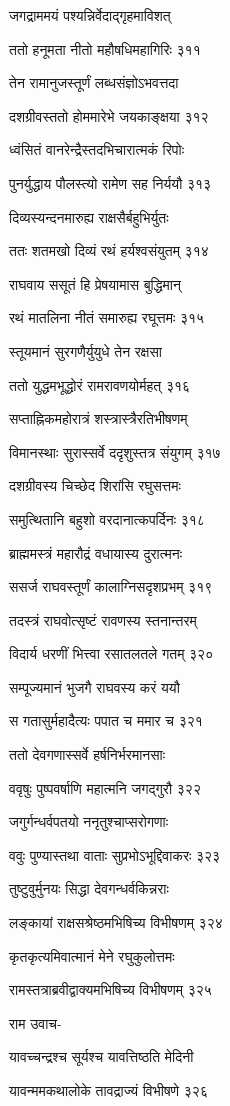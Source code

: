 जगद्राममयं पश्यन्निर्वेदाद्गृहमाविशत्

ततो हनूमता नीतो महौषधिमहागिरिः ३११

तेन रामानुजस्तूर्णं लब्धसंज्ञोऽभवत्तदा

दशग्रीवस्ततो होममारेभे जयकाङ्क्षया ३१२

ध्वंसितं वानरेन्द्रैस्तदभिचारात्मकं रिपोः

पुनर्युद्धाय पौलस्त्यो रामेण सह निर्ययौ ३१३

दिव्यस्यन्दनमारुह्य राक्षसैर्बहुभिर्युतः

ततः शतमखो दिव्यं रथं हर्यश्वसंयुतम् ३१४

राघवाय ससूतं हि प्रेषयामास बुद्धिमान्

रथं मातलिना नीतं समारुह्य रघूत्तमः ३१५

स्तूयमानं सुरगणैर्युयुधे तेन रक्षसा

ततो युद्धमभूद्धोरं रामरावणयोर्महत् ३१६

सप्ताह्निकमहोरात्रं शस्त्रास्त्रैरतिभीषणम्

विमानस्थाः सुरास्सर्वे ददृशुस्तत्र संयुगम् ३१७

दशग्रीवस्य चिच्छेद शिरांसि रघुसत्तमः

समुत्थितानि बहुशो वरदानात्कपर्दिनः ३१८

ब्राह्ममस्त्रं महारौद्रं वधायास्य दुरात्मनः

ससर्ज राघवस्तूर्णं कालाग्निसदृशप्रभम् ३१९

तदस्त्रं राघवोत्सृष्टं रावणस्य स्तनान्तरम्

विदार्य धरणीं भित्त्वा रसातलतले गतम् ३२०

सम्पूज्यमानं भुजगै राघवस्य करं ययौ

स गतासुर्महादैत्यः पपात च ममार च ३२१

ततो देवगणास्सर्वे हर्षनिर्भरमानसाः

ववृषुः पुष्पवर्षाणि महात्मनि जगद्गुरौ ३२२

जगुर्गन्धर्वपतयो ननृतुश्चाप्सरोगणाः

ववुः पुण्यास्तथा वाताः सुप्रभोऽभूद्दिवाकरः ३२३

तुष्टुवुर्मुनयः सिद्धा देवगन्धर्वकिन्नराः

लङ्कायां राक्षसश्रेष्ठमभिषिच्य विभीषणम् ३२४

कृतकृत्यमिवात्मानं मेने रघुकुलोत्तमः

रामस्तत्राब्रवीद्वाक्यमभिषिच्य विभीषणम् ३२५

राम उवाच-

यावच्चन्द्रश्च सूर्यश्च यावत्तिष्ठति मेदिनी

यावन्ममकथालोके तावद्राज्यं विभीषणे ३२६

